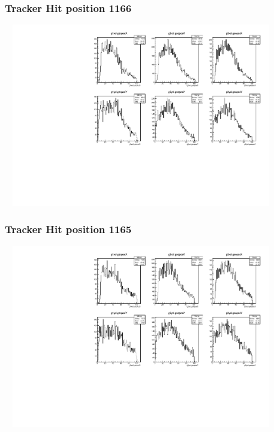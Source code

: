 \documentclass[slidestop,compress,mathserif]{beamer}
\begin{document}
\begin{frame}\frametitle{Tracker Hit position 1166}
	 \includegraphics[width=12cm,height=8cm]{Tracker_Hit_position_1166.pdf}
\end{frame}
\begin{frame}\frametitle{Tracker Hit position 1165}
	 \includegraphics[width=12cm,height=8cm]{Tracker_Hit_position_1165.pdf}
\end{frame}
\end{document}
